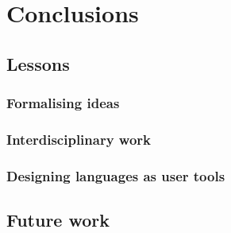 \chapter{Conclusions}

\section{Lessons}

\subsection{Formalising ideas}

\subsection{Interdisciplinary work}

\subsection{Designing languages as user tools}

\section{Future work}
